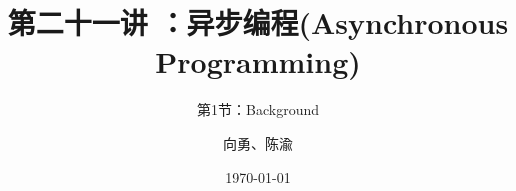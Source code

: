 


\title[第21讲]{第二十一讲 ：异步编程(Asynchronous Programming)} %
\subtitle{第1节：Background}
\author{向勇、陈渝} %
\date{\today} %



\begin{frame}
\titlepage %
\end{frame}

